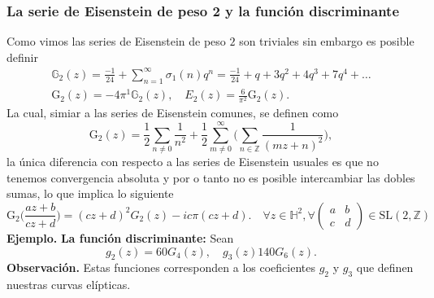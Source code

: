 \documentclass[letterpaper]{article}
\newcommand{\zah}{\ensuremath{ \mathbb Z }}
\newcommand{\eje}{{\newline \noindent \sc \textbf{Ejemplo. }}}
\newcommand{\obs}{{\newline \noindent \sc \textbf{Observación. }}}
\newcommand{\hd}{\ensuremath{\mathbb H^2}}
\newcommand{\slz}{\ensuremath{\mathrm{SL}(2,\mathbb Z) }}
\begin{document}
\subsubsection{La serie de Eisenstein de peso 2 y la función discriminante}
\label{sec:org1742e6a}
\noindent Como vimos las series de Eisenstein de peso \(2\) son triviales sin embargo es posible definir
\begin{align*}
 \mathbb{G}_2(z)=\frac{-1}{24}+\sum_{n=1}^{\infty}\sigma_1(n)q^n=\frac{-1}{24}+q+3q^2+4q^3+7q^4+\dots\\
 \mathrm{G}_2(z)=-4\pi^1\mathbb{G}_2(z),\quad E_2(z)=\frac{6}{\pi^2}\mathrm{G}_2(z).
\end{align*}
La cual, simiar a las series de Eisenstein comunes, se definen como
\[
\mathrm{G}_2(z)=\frac{1}{2}\sum_{n\neq 0}\frac{1}{n^2}+\frac{1}{2}\sum_{m\neq0}^{\infty}\Big(\sum_{n\in\zah}\frac{1}{(mz+n)^2}\Big),
\]
la única diferencia con respecto a las series de Eisenstein usuales es que no tenemos convergencia absoluta y por o tanto no es posible intercambiar las dobles sumas, lo que implica lo siguiente
\begin{equation}
\mathrm{G}_2\Big(\frac{az+b}{cz+d}\Big)=(cz+d)^2G_2(z)-ic\pi(cz+d).\quad\forall z\in\hd,\forall\begin{pmatrix}a & b\\ c & d \end{pmatrix}\in\slz
\end{equation}
\eje \textbf{La función discriminante:} Sean
\[
    g_2(z)=60G_4(z),\quad g_3(z)140G_6(z).
\]
\obs Estas funciones corresponden a los coeficientes \(g_2\) y \(g_3\) que definen nuestras curvas elípticas.
\end{document}
